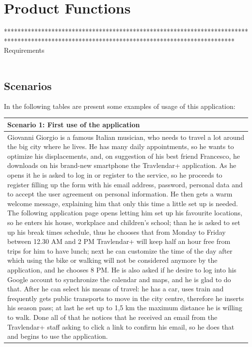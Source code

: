 \section{Product Functions}
******************************************************************************************************************************************** \\
Requirements
\\
\\
\subsection*{Scenarios}
In the following tables are present some examples of usage of this application:
%
\begin{center}
\def\arraystretch{1.5}
  \begin{tabular}{ | p{} | }
    \hline
    Scenario 1: First use of the application \\ \hline
    Giovanni Giorgio is a famous Italian musician, who needs to travel a lot around the big city where he lives. He has many daily appointments, so he wants to optimize his displacements, and, on suggestion of his best friend Francesco, he downloads on his brand-new smartphone the Travlendar+ application. As he opens it he is asked to log in or register to the service, so he proceeds to register filling up the form with his email address, password, personal data and to accept the user agreement on personal information. He then gets a warm welcome message, explaining him that only this time a little set up is needed. The following application page opens letting him set up his favourite locations, so he enters his house, workplace and children’s school; than he is asked to set up his break times schedule, thus he chooses that from Monday to Friday between 12.30 AM and 2 PM Travlendar+ will keep half an hour free from trips for him to have lunch; next he can customize the time of the day after which using the bike or walking will not be considered anymore by the application, and he chooses 8 PM. He is also asked if he desire to log into his Google account to synchronize the calendar and maps, and he is glad to do that. After he can select his means of travel: he has a car, uses train and frequently gets public transports to move in the city centre, therefore he inserts his season pass; at last he set up to 1,5 km the maximum distance he is willing to walk. Done all of that he notices that he received an email from the Travlendar+ staff asking to click a link to confirm his email, so he does that and begins to use the application. \\ \hline
  \end{tabular}
\end{center}
